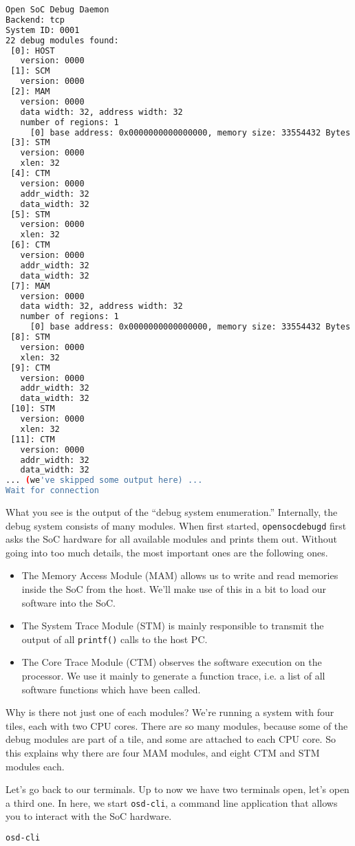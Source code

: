 \begin{lstlisting}[language=sh]
Open SoC Debug Daemon
Backend: tcp
System ID: 0001
22 debug modules found:
 [0]: HOST
   version: 0000
 [1]: SCM
   version: 0000
 [2]: MAM
   version: 0000
   data width: 32, address width: 32
   number of regions: 1
     [0] base address: 0x0000000000000000, memory size: 33554432 Bytes
 [3]: STM
   version: 0000
   xlen: 32
 [4]: CTM
   version: 0000
   addr_width: 32
   data_width: 32
 [5]: STM
   version: 0000
   xlen: 32
 [6]: CTM
   version: 0000
   addr_width: 32
   data_width: 32
 [7]: MAM
   version: 0000
   data width: 32, address width: 32
   number of regions: 1
     [0] base address: 0x0000000000000000, memory size: 33554432 Bytes
 [8]: STM
   version: 0000
   xlen: 32
 [9]: CTM
   version: 0000
   addr_width: 32
   data_width: 32
 [10]: STM
   version: 0000
   xlen: 32
 [11]: CTM
   version: 0000
   addr_width: 32
   data_width: 32
... (we've skipped some output here) ...
Wait for connection
\end{lstlisting}

What you see is the output of the ``debug system enumeration.''
Internally, the debug system consists of many modules.
When first started, \verb|opensocdebugd| first asks the SoC hardware for all available modules and prints them out.
Without going into too much details, the most important ones are the following ones.
\begin{itemize}
 \item The Memory Access Module (MAM) allows us to write and read memories inside the SoC from the host.
   We'll make use of this in a bit to load our software into the SoC.
 \item The System Trace Module (STM) is mainly responsible to transmit the output of all \verb|printf()| calls to the host PC.
 \item The Core Trace Module (CTM) observes the software execution on the processor.
   We use it mainly to generate a function trace, i.e. a list of all software functions which have been called.
\end{itemize}

Why is there not just one of each modules?
We're running a system with four tiles, each with two CPU cores.
There are so many modules, because some of the debug modules are part of a tile, and some are attached to each CPU core.
So this explains why there are four MAM modules, and eight CTM and STM modules each.

Let's go back to our terminals.
Up to now we have two terminals open, let's open a third one.
In here, we start \verb|osd-cli|, a command line application that allows you to interact with the SoC hardware.
\begin{lstlisting}[language=sh]
osd-cli
\end{lstlisting}

